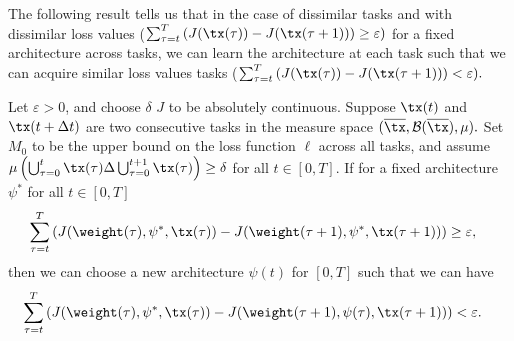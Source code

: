The following result tells us that in the case of dissimilar tasks and with dissimilar loss values ($\sum_{\tau = t}^{T} \left(J(\tx(\tau)) - J(\tx(\tau+1))\right)\geq \varepsilon)$ for a fixed architecture across tasks, we can learn the architecture at each task such that we can acquire similar loss values tasks ($\sum_{\tau = t}^{T} \left(J(\tx(\tau)) - J(\tx(\tau+1))\right) < \varepsilon).$ 
\begin{theorem}\label{thm:intersection}
    Let $\varepsilon >0$, and choose $\delta$ $J$ to be absolutely continuous.
    Suppose $\tx(t)$ and $\tx(t+\Delta t)$ are two consecutive tasks in the measure space $(\overline{\tx}, \mathcal{B}(\overline{\tx}),\mu).$ Set $M_0$ to be the upper bound on the loss function $\ell$ across all tasks, and assume $\mu\left( \bigcup_{\tau = 0}^{t}\tx(\tau)\Delta \bigcup_{\tau = 0}^{t+1}\tx(\tau)\right)\geq \delta$ for all $t\in [0,T].$ If for a fixed architecture $\psi^*$ for all $t\in [0,T]$
    \begin{align*}
        \sum_{\tau = t}^{T} \left(J(\weight(\tau), \psi^*, \tx(\tau)) - J(\weight(\tau+1), \psi^*, \tx(\tau+1))\right) & \geq \varepsilon,
    \end{align*}
    then we can choose a new architecture $\psi(t)$ for $[0,T]$ such that we can have
    \begin{align*}
        \sum_{\tau = t}^{T} \left(J(\weight(\tau), \psi^*, \tx(\tau)) - J(\weight(\tau+1), \psi(\tau), \tx(\tau+1))\right) & < \varepsilon.
    \end{align*}
\end{theorem}

